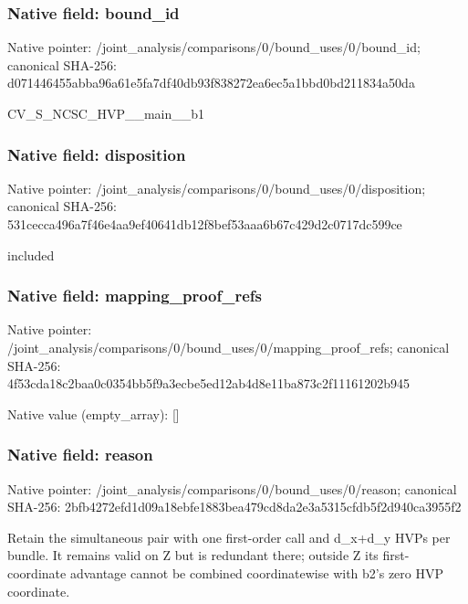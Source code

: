 \documentclass[10pt,a4paper]{article}
\begin{document}
\subsubsection{Native field: bound\_\allowbreak{}id}
Native pointer: /joint\_\allowbreak{}analysis/comparisons/0/bound\_\allowbreak{}uses/0/bound\_\allowbreak{}id; canonical SHA-256: d071446455abba96a61e5fa7df40db93f838272ea6ec5a1bbd0bd211834a50da

\begingroup\raggedright\sloppy CV\_\allowbreak{}S\_\allowbreak{}NCSC\_\allowbreak{}HVP\_\allowbreak{}\_\allowbreak{}main\_\allowbreak{}\_\allowbreak{}b1\par\endgroup

\subsubsection{Native field: disposition}
Native pointer: /joint\_\allowbreak{}analysis/comparisons/0/bound\_\allowbreak{}uses/0/disposition; canonical SHA-256: 531cecca496a7f46e4aa9ef40641db12f8bef53aaa6b67c429d2c0717dc599ce

\begingroup\raggedright\sloppy included\par\endgroup

\subsubsection{Native field: mapping\_\allowbreak{}proof\_\allowbreak{}refs}
Native pointer: /joint\_\allowbreak{}analysis/comparisons/0/bound\_\allowbreak{}uses/0/mapping\_\allowbreak{}proof\_\allowbreak{}refs; canonical SHA-256: 4f53cda18c2baa0c0354bb5f9a3ecbe5ed12ab4d8e11ba873c2f11161202b945

Native value (empty\_\allowbreak{}array): []

\subsubsection{Native field: reason}
Native pointer: /joint\_\allowbreak{}analysis/comparisons/0/bound\_\allowbreak{}uses/0/reason; canonical SHA-256: 2bfb4272efd1d09a18ebfe1883bea479cd8da2e3a5315cfdb5f2d940ca3955f2

\begingroup\raggedright\sloppy Retain the simultaneous pair with one first-order call and d\_\allowbreak{}x+d\_\allowbreak{}y HVPs per bundle. It remains valid on Z but is redundant there;\allowbreak{} outside Z its first-coordinate advantage cannot be combined coordinatewise with b2's zero HVP coordinate.\par\endgroup
\end{document}
